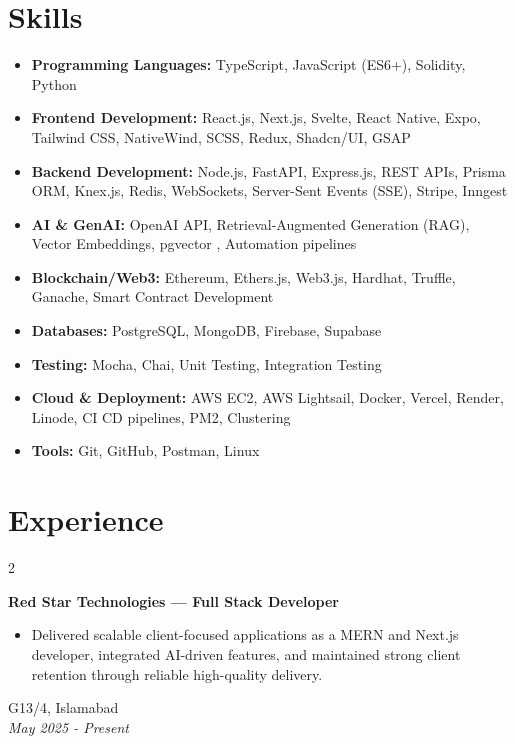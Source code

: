 \documentclass[10pt, letterpaper]{article}
\newenvironment{highlights}{
    \begin{itemize}[
        topsep=0.10 cm,
        parsep=0.10 cm,
        partopsep=0pt,
        itemsep=0pt,
        leftmargin=0.4 cm + 10pt
    ]
}{
    \end{itemize}
}
\newenvironment{twocolentry}[2][]{
    \onecolentry
    \def\secondColumn{#2}
    \setcolumnwidth{\fill, 4.5 cm}
    \begin{paracol}{2}
}{
    \switchcolumn \raggedleft \secondColumn
    \end{paracol}
    \endonecolentry
}
\begin{document}
\section{Skills}
\begin{highlights}

	\item \textbf{Programming Languages:} TypeScript, JavaScript (ES6+), Solidity, Python

	\item \textbf{Frontend Development:} React.js, Next.js, Svelte, React Native, Expo, Tailwind CSS, NativeWind, SCSS, Redux, Shadcn/UI, GSAP

	\item \textbf{Backend Development:} Node.js, FastAPI, Express.js, REST APIs, Prisma ORM, Knex.js, Redis, WebSockets, Server-Sent Events (SSE), Stripe, Inngest

	\item \textbf{AI \& GenAI:} OpenAI API, Retrieval-Augmented Generation (RAG), Vector Embeddings, pgvector , Automation pipelines

	\item \textbf{Blockchain/Web3:} Ethereum, Ethers.js, Web3.js, Hardhat, Truffle, Ganache, Smart Contract Development

	\item \textbf{Databases:} PostgreSQL, MongoDB, Firebase, Supabase

	\item \textbf{Testing:} Mocha, Chai, Unit Testing, Integration Testing

	\item \textbf{Cloud \& Deployment:} AWS EC2, AWS Lightsail, Docker, Vercel, Render, Linode, CI CD pipelines, PM2, Clustering

	\item \textbf{Tools:} Git, GitHub, Postman, Linux

\end{highlights}
\section{Experience}
\begin{twocolentry}{
		G13/4, Islamabad\\
		\textit{ May 2025 - Present}
	}
	\textbf{Red Star Technologies — Full Stack Developer}
	\begin{highlights}

		\item Delivered scalable client-focused applications as a MERN and Next.js developer, integrated AI-driven features, and maintained strong client retention through reliable high-quality delivery.	\end{highlights}
\end{twocolentry}
\end{document}

